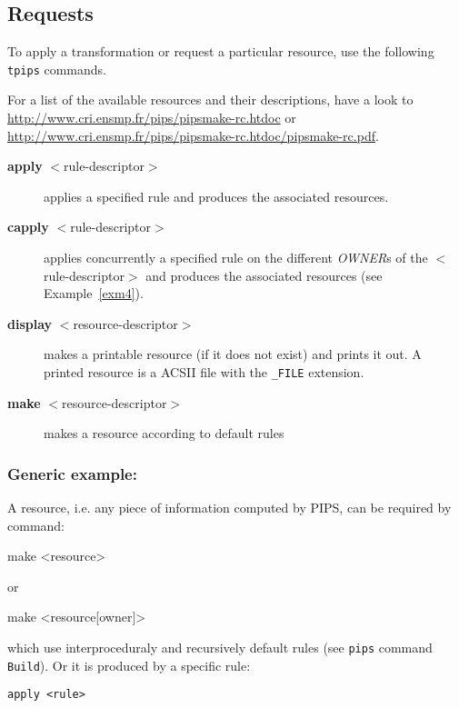 \documentclass[a4paper]{article}
\newcommand{\PipsPIPSmakePDF}{\url{http://www.cri.ensmp.fr/pips/pipsmake-rc.htdoc/pipsmake-rc.pdf}\xspace}
\newcommand{\PipsPIPSmakeHTDOC}{\url{http://www.cri.ensmp.fr/pips/pipsmake-rc.htdoc}\xspace}
\begin{document}
\subsection{Requests}

To apply a transformation or request a particular resource, use the
following \texttt{tpips} commands.

For a list of the available resources and their descriptions, have a look
to \PipsPIPSmakeHTDOC or \PipsPIPSmakePDF.

\begin{description}

\item[{\bf apply} $<$rule-descriptor$>$] applies a specified rule and
  produces the associated resources.

\item[{\bf capply} $<$rule-descriptor$>$] applies concurrently a specified
  rule on the different \emph{OWNER}s of the $<$rule-descriptor$>$ and
  produces the associated resources (see Example~\ref{exm4}).

\item[{\bf display} $<$resource-descriptor$>$] makes a printable resource
  (if it does not exist) and prints it out. A printed resource is a ACSII
  file with the \verb+_FILE+ extension.

\item[{\bf make} $<$resource-descriptor$>$] makes a resource according to
  default rules

\end{description}


\subsubsection*{Generic example:}

A resource, i.e. any piece of information computed by PIPS,
can be required by command:

{\bf
\begin{verbatim*}
make <resource>
\end{verbatim*}
}

or

{\bf
\begin{verbatim*}
make <resource[owner]>
\end{verbatim*}
}

which use interproceduraly and recursively default rules (see
\texttt{pips} command \texttt{Build}). Or it is produced by a specific
rule: {\bf
\begin{verbatim}
apply <rule>
\end{verbatim}
}
\end{document}
